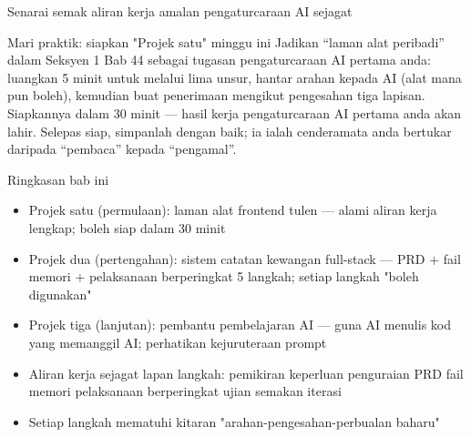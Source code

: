 \begin{center}\small\color{gray}Senarai semak aliran kerja amalan pengaturcaraan AI sejagat\end{center}

\begin{tcbpractice}{Mari praktik: siapkan "Projek satu" minggu ini}
Jadikan “laman alat peribadi” dalam Seksyen 1 Bab 44 sebagai tugasan pengaturcaraan AI pertama anda: luangkan 5 minit untuk melalui lima unsur, hantar arahan kepada AI (alat mana pun boleh), kemudian buat penerimaan mengikut pengesahan tiga lapisan. Siapkannya dalam 30 minit — hasil kerja pengaturcaraan AI pertama anda akan lahir. Selepas siap, simpanlah dengan baik; ia ialah cenderamata anda bertukar daripada “pembaca” kepada “pengamal”.

\end{tcbpractice}

\begin{tcbsummary}{Ringkasan bab ini}
\begin{itemize}
  \item Projek satu (permulaan): laman alat frontend tulen — alami aliran kerja lengkap; boleh siap dalam 30 minit
  \item Projek dua (pertengahan): sistem catatan kewangan full-stack — PRD + fail memori + pelaksanaan berperingkat 5 langkah; setiap langkah "boleh digunakan"
  \item Projek tiga (lanjutan): pembantu pembelajaran AI — guna AI menulis kod yang memanggil AI; perhatikan kejuruteraan prompt
  \item Aliran kerja sejagat lapan langkah: pemikiran keperluan penguraian PRD fail memori pelaksanaan berperingkat ujian semakan iterasi
  \item Setiap langkah mematuhi kitaran "arahan-pengesahan-perbualan baharu"
\end{itemize}

\end{tcbsummary}
